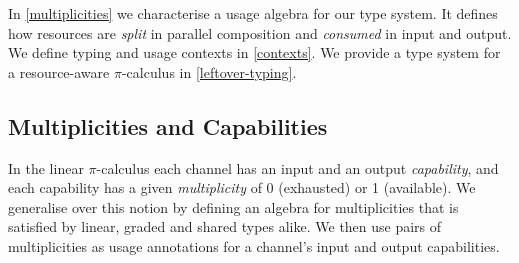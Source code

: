 \documentclass[]{llncs}
\newcommand{\picalc}{$\pi$-calculus}
\begin{document}
In \autoref{multiplicities} we characterise a usage algebra for our type system.
It defines how resources are \emph{split} in parallel composition and \emph{consumed} in input and output.
We define typing and usage contexts in \autoref{contexts}.
We provide a type system for a resource-aware \picalc{} in \autoref{leftover-typing}.

\subsection{Multiplicities and Capabilities}
\label{multiplicities}

In the linear \picalc{} each channel has an input and an output \emph{capability}, and each capability has a given \emph{multiplicity} of 0 (exhausted) or 1 (available).
We generalise over this notion by defining an algebra for multiplicities that is satisfied by linear, graded and shared types alike.
We then use pairs of multiplicities as usage annotations for a channel's input and output capabilities.
\end{document}
